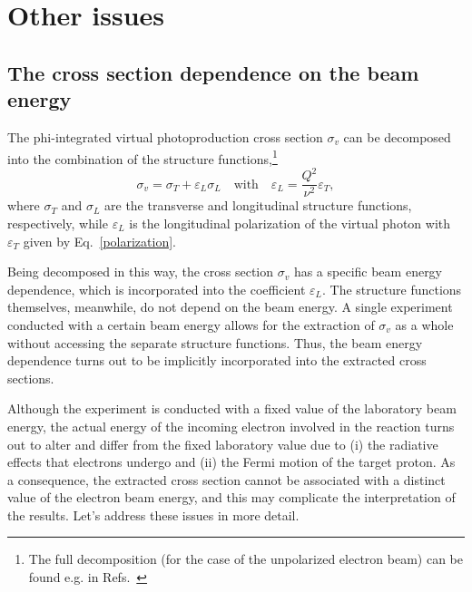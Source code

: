 \chapter{Other issues}
\label{Sect:issues}


\section{The cross section dependence on the beam energy}


The phi-integrated virtual photoproduction cross section $\sigma_{v}$ can be decomposed into the combination of the structure functions,\footnote[1]{The full decomposition (for the case of the unpolarized electron beam) can be found e.g. in Refs.~\cite{twopeg,Skorodumina:2016pnb} }
\begin{equation}
\sigma_{v} = \sigma_{T} + \varepsilon_{L}\sigma_{L}\text{~~~with~~~}\varepsilon_{L}=\frac{Q^{2}}{\nu^{2}}\varepsilon_{T},\label{eq:beam_en_dep}
\end{equation}
where $\sigma_{T}$ and $\sigma_{L}$ are the transverse and longitudinal structure functions, respectively, while $\varepsilon_{L}$ is the longitudinal polarization of the virtual photon with $\varepsilon_{T}$ given by Eq.~\eqref{polarization}.

Being decomposed in this way, the cross section $\sigma_{v}$ has a specific beam energy dependence, which is incorporated into the coefficient $\varepsilon_{L}$. The structure functions themselves, meanwhile, do not depend on the beam energy. A single experiment conducted with a certain beam energy allows for the extraction of $\sigma_{v}$ as a whole without accessing the separate structure functions. Thus, the beam energy dependence turns out to be implicitly incorporated into the extracted cross sections.

Although the experiment is conducted with a fixed value of the laboratory beam energy, the actual energy of the incoming electron involved in the reaction turns out to alter and differ from the fixed laboratory value due to  (i) the radiative effects that electrons undergo and (ii) the Fermi motion of the target proton. As a consequence, the extracted cross section cannot be associated with a distinct value of the electron beam energy, and this may complicate the interpretation of the results. Let's address these issues in more detail. 


